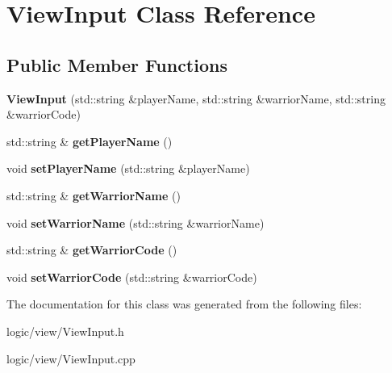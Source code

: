 \hypertarget{classViewInput}{}\section{View\+Input Class Reference}
\label{classViewInput}
\subsection*{Public Member Functions}
\begin{DoxyCompactItemize}
\item 
\mbox{\label{classViewInput_a86fd2394decd950e1136aeda17705ee1}} 
{\bfseries View\+Input} (std\+::string \&player\+Name, std\+::string \&warrior\+Name, std\+::string \&warrior\+Code)
\item 
\mbox{\label{classViewInput_a8e15a815e1c1e08ba4c7d67502eaeff8}} 
std\+::string \& {\bfseries get\+Player\+Name} ()
\item 
\mbox{\label{classViewInput_a66aae95ada6977e5a3afd761132996f9}} 
void {\bfseries set\+Player\+Name} (std\+::string \&player\+Name)
\item 
\mbox{\label{classViewInput_ae8be41339da075fc5edb72d2397b50d8}} 
std\+::string \& {\bfseries get\+Warrior\+Name} ()
\item 
\mbox{\label{classViewInput_aa1cda1e1809de06e3599b8ff95c71f36}} 
void {\bfseries set\+Warrior\+Name} (std\+::string \&warrior\+Name)
\item 
\mbox{\label{classViewInput_a4ff0c08104f47c1e6628e84de0819fbe}} 
std\+::string \& {\bfseries get\+Warrior\+Code} ()
\item 
\mbox{\label{classViewInput_a50a50abaeed98aaca38f943a45df95bd}} 
void {\bfseries set\+Warrior\+Code} (std\+::string \&warrior\+Code)
\end{DoxyCompactItemize}


The documentation for this class was generated from the following files\+:\begin{DoxyCompactItemize}
\item 
logic/view/View\+Input.\+h\item 
logic/view/View\+Input.\+cpp\end{DoxyCompactItemize}

